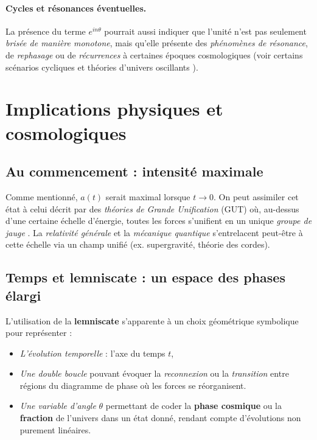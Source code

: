 \documentclass[12pt]{article}
\begin{document}
\paragraph{Cycles et résonances éventuelles.}
La présence du terme $e^{i n \theta}$ pourrait aussi indiquer que l'unité 
n'est pas seulement \emph{brisée de manière monotone}, mais qu'elle présente 
des \emph{phénomènes de résonance}, de \emph{rephasage} ou de \emph{récurrences} 
à certaines époques cosmologiques (voir certains scénarios cycliques 
et théories d'univers oscillants \cite{steinhardt2002cyclic}).

\section{Implications physiques et cosmologiques}

\subsection{Au commencement : intensité maximale}

Comme mentionné, $a(t)$ serait maximal lorsque $t \to 0$. On peut assimiler 
cet état à celui décrit par des \emph{théories de Grande Unification} (GUT) 
où, au-dessus d'une certaine échelle d'énergie, toutes les forces s'unifient 
en un unique \textit{groupe de jauge} \cite{georgi1974unified}. 
La \emph{relativité générale} et la \emph{mécanique quantique} 
s'entrelacent peut-être à cette échelle via un champ unifié (ex. supergravité, 
théorie des cordes).

\subsection{Temps et lemniscate : un espace des phases élargi}

L'utilisation de la \textbf{lemniscate} s'apparente à un choix géométrique 
symbolique pour représenter :
\begin{itemize}
    \item \emph{L’évolution temporelle} : l'axe du temps $t$,
    \item \emph{Une double boucle} pouvant évoquer la \textit{reconnexion} ou la 
          \textit{transition} entre régions du diagramme de phase où les forces 
          se réorganisent.
    \item \emph{Une variable d’angle} $\theta$ permettant de coder 
          la \textbf{phase cosmique} ou la \textbf{fraction} de l'univers dans un état donné, 
          rendant compte d’évolutions non purement linéaires.
\end{itemize}
\end{document}
